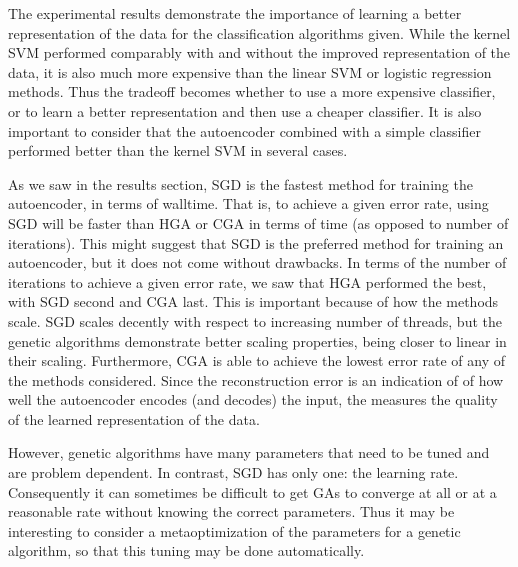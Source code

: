 The experimental results demonstrate the importance of learning a better representation of the data for the classification algorithms given. While the kernel SVM performed comparably with and without the improved representation of the data, it is also much more expensive than the linear SVM or logistic regression methods. Thus the tradeoff becomes whether to use a more expensive classifier, or to learn a better representation and then use a cheaper classifier. It is also important to consider that the autoencoder combined with a simple classifier performed better than the kernel SVM in several cases.

As we saw in the results section, SGD is the fastest method for training the autoencoder, in terms of walltime. That is, to achieve a given error rate, using SGD will be faster than HGA or CGA in terms of time (as opposed to number of iterations). This might suggest that SGD is the preferred method for training an autoencoder, but it does not come without drawbacks. In terms of the number of iterations to achieve a given error rate, we saw that HGA performed the best, with SGD second and CGA last. This is important because of how the methods scale. SGD scales decently with respect to increasing number of threads, but the genetic algorithms demonstrate better scaling properties, being closer to linear in their scaling. 
Furthermore, CGA is able to achieve the lowest error rate of any of the methods considered. Since the reconstruction error is an indication of of how well the autoencoder encodes (and decodes) the input, the measures the quality of the learned representation of the data.

However, genetic algorithms have many parameters that need to be tuned and are problem dependent. In contrast, SGD has only one: the learning rate. Consequently it can sometimes be difficult to get GAs to converge at all or at a reasonable rate without knowing the correct parameters. Thus it may be interesting to consider a metaoptimization of the parameters for a genetic algorithm, so that this tuning may be done automatically. 

